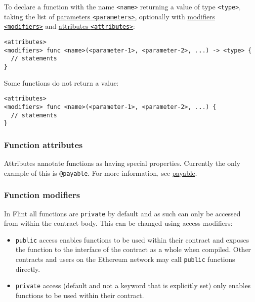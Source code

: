 To declare a function with the name \texttt{<name>} returning a value of type \texttt{<type>}, taking the list of \hyperref[sec:appendix-b-function-parameters]{parameters \texttt{<parameters>}}, optionally with \hyperref[sec:appendix-b-function-modifiers]{modifiers \texttt{<modifiers>}} and \hyperref[sec:appendix-b-function-attributes]{attributes \texttt{<attributes>}}:

\begin{verbatim}
<attributes>
<modifiers> func <name>(<parameter-1>, <parameter-2>, ...) -> <type> {
  // statements
}
\end{verbatim}

Some functions do not return a value:

\begin{verbatim}
<attributes>
<modifiers> func <name>(<parameter-1>, <parameter-2>, ...) {
  // statements
}
\end{verbatim}

\subsubsection{Function attributes}
\label{sec:appendix-b-function-attributes}

Attributes annotate functions as having special properties. Currently the only example of this is \texttt{@payable}. For more information, see \hyperref[sec:appendix-b-payable]{payable}.

\subsubsection{Function modifiers}
\label{sec:appendix-b-function-modifiers}

In Flint all functions are \texttt{private} by default and as such can only be accessed from within the contract body. This can be changed using access modifiers:

\begin{itemize}
	\item \texttt{public} access enables functions to be used within their contract and exposes the function to the interface of the contract as a whole when compiled. Other contracts and users on the Ethereum network may call \texttt{public} functions directly.
	\item \texttt{private} access (default and not a keyword that is explicitly set) only enables functions to be used within their contract.
\end{itemize}


